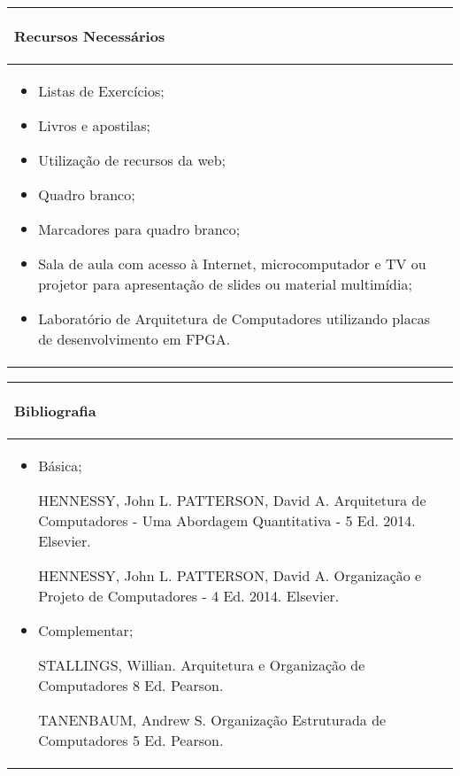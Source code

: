 \begin{table}[h]
\centering
\begin{small} 
 
\setlength{\tabcolsep}{3pt} 
\begin{tabular}{|p{15cm}|}\hline

\begin{center}\textbf{Recursos Necessários}\end{center}\\ \hline
\begin{itemize} 
  \item Listas de Exercícios;
  \item Livros e apostilas;
  \item Utilização de recursos da web;
  \item Quadro branco;
  \item Marcadores para quadro branco;
  \item Sala de aula com acesso à Internet, microcomputador e TV ou projetor para apresentação de slides ou material multimídia;
  \item Laboratório de Arquitetura de Computadores utilizando placas de desenvolvimento em FPGA.
\end{itemize}
 \\ \hline

\end{tabular} 
\end{small}
\label{dadosinstituicao}
\end{table}


\begin{table}[h]
\centering
\begin{small} 
\setlength{\tabcolsep}{3pt} 
\begin{tabular}{|p{15cm}|}\hline

\begin{center}\textbf{Bibliografia}\end{center}\\ \hline
\begin{itemize} 
  \item Básica;
  
  HENNESSY, John L. PATTERSON, David A. Arquitetura de Computadores - Uma Abordagem Quantitativa - 5 Ed. 2014. Elsevier.
  
  HENNESSY, John L. PATTERSON, David A. Organização e Projeto de Computadores - 4 Ed. 2014. Elsevier.
  
  \item Complementar;
  
  STALLINGS, Willian. Arquitetura e Organização de Computadores 8 Ed. Pearson.

  TANENBAUM, Andrew S. Organização Estruturada de Computadores 5 Ed. Pearson.  

\end{itemize}
 \\ \hline

\end{tabular} 
\end{small}
\label{dadosinstituicao}
\end{table}
